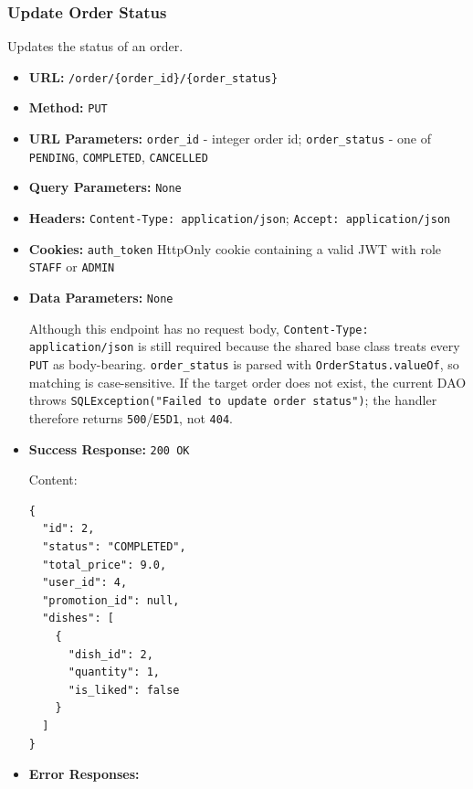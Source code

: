 \subsubsection*{Update Order Status}

Updates the status of an order.

\begin{itemize}[nosep]
\item \textbf{URL:} \texttt{/order/\{order\_id\}/\{order\_status\}}

\item \textbf{Method:} \texttt{PUT}

\item \textbf{URL Parameters:} \texttt{order\_id} - integer order id; \texttt{order\_status} - one of \texttt{PENDING}, \texttt{COMPLETED}, \texttt{CANCELLED}

\item \textbf{Query Parameters:} \texttt{None}

\item \textbf{Headers:} \texttt{Content-Type: application/json}; \texttt{Accept: application/json}

\item \textbf{Cookies:} \texttt{auth\_token} HttpOnly cookie containing a valid JWT with role \texttt{STAFF} or \texttt{ADMIN}

\item \textbf{Data Parameters:} \texttt{None}

Although this endpoint has no request body, \texttt{Content-Type: application/json} is still required because the shared base class treats every \texttt{PUT} as body-bearing. \texttt{order\_status} is parsed with \texttt{OrderStatus.valueOf}, so matching is case-sensitive. If the target order does not exist, the current DAO throws \texttt{SQLException("Failed to update order status")}; the handler therefore returns \texttt{500}/\texttt{E5D1}, not \texttt{404}.

\item \textbf{Success Response:} \texttt{200 OK}

Content:

\begin{lstlisting}
{
  "id": 2,
  "status": "COMPLETED",
  "total_price": 9.0,
  "user_id": 4,
  "promotion_id": null,
  "dishes": [
    {
      "dish_id": 2,
      "quantity": 1,
      "is_liked": false
    }
  ]
}
\end{lstlisting}

\item \textbf{Error Responses:}


\end{itemize}
